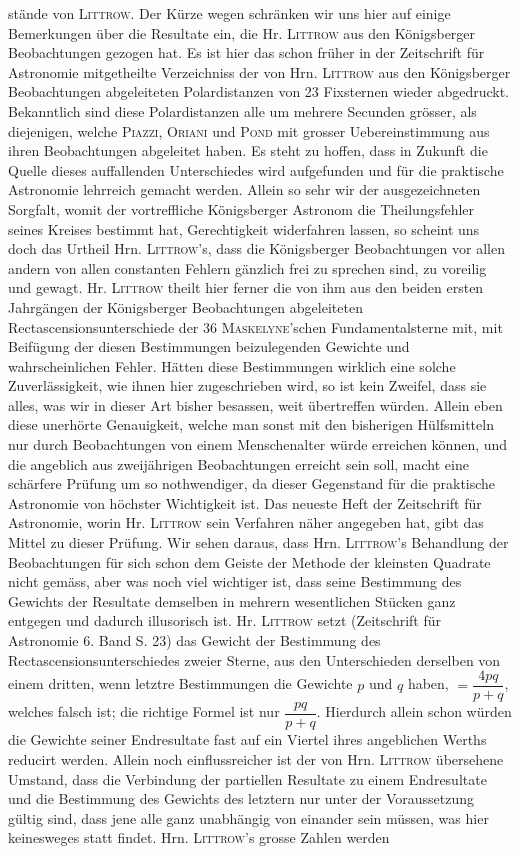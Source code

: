 \noindent stände von \textsc{Littrow}. Der Kürze wegen schränken wir uns hier auf einige Bemerkungen über die Resultate ein, die Hr. \textsc{Littrow} aus den Königsberger Beobachtungen gezogen hat. Es ist hier das schon früher in der Zeitschrift für Astronomie mitgetheilte Verzeichniss der von Hrn. \textsc{Littrow} aus den Königsberger Beobachtungen abgeleiteten Polardistanzen von 23 Fixsternen wieder abgedruckt. Bekanntlich sind diese Polardistanzen alle um mehrere Secunden grösser, als diejenigen, welche \textsc{Piazzi}, \textsc{Oriani} und \textsc{Pond} mit grosser Uebereinstimmung aus ihren Beobachtungen abgeleitet haben. Es steht zu hoffen, dass in Zukunft die Quelle dieses auffallenden Unterschiedes wird aufgefunden und für die praktische Astronomie lehrreich gemacht werden. Allein so sehr wir der ausgezeichneten Sorgfalt, womit der vortreffliche Königsberger Astronom die Theilungsfehler seines Kreises bestimmt hat, Gerechtigkeit widerfahren lassen, so scheint uns doch das Urtheil Hrn. \textsc{Littrow}'s, dass die Königsberger Beobachtungen vor allen andern von allen constanten Fehlern gänzlich frei zu sprechen sind, zu voreilig und gewagt. Hr. \textsc{Littrow} theilt hier ferner die von ihm aus den beiden ersten Jahrgängen der Königsberger Beobachtungen abgeleiteten Rectascensionsunterschiede der 36 \textsc{Maskelyne}'schen Fundamentalsterne mit, mit Beifügung der diesen Bestimmungen beizulegenden Gewichte und wahrscheinlichen Fehler. Hätten diese Bestimmungen wirklich eine solche Zuverlässigkeit, wie ihnen hier zugeschrieben wird, so ist kein Zweifel, dass sie alles, was wir in dieser Art bisher besassen, weit übertreffen würden. Allein eben diese unerhörte Genauigkeit, welche man sonst mit den bisherigen Hülfsmitteln nur durch Beobachtungen von einem Menschenalter würde erreichen können, und die angeblich aus zweijährigen Beobachtungen erreicht sein soll, macht eine schärfere Prüfung um so nothwendiger, da dieser Gegenstand für die praktische Astronomie von höchster Wichtigkeit ist. Das neueste Heft der Zeitschrift für Astronomie, worin Hr. \textsc{Littrow} sein Verfahren näher angegeben hat, gibt das Mittel zu dieser Prüfung. Wir sehen daraus, dass Hrn. \textsc{Littrow}'s Behandlung der Beobachtungen für sich schon dem Geiste der Methode der kleinsten Quadrate nicht gemäss, aber was noch viel wichtiger ist, dass seine Bestimmung des Gewichts der Resultate demselben in mehrern wesentlichen Stücken ganz entgegen und dadurch illusorisch ist. Hr. \textsc{Littrow} setzt (Zeitschrift für Astronomie 6. Band S. 23) das Gewicht der Bestimmung des Rectascensionsunterschiedes zweier Sterne, aus den Unterschieden derselben von einem dritten, wenn letztre Bestimmungen die Gewichte $p$ und $q$ haben, $=\dfrac{4pq}{p+q}$, welches falsch ist; die richtige Formel ist nur $\dfrac{pq}{p+q}$. Hierdurch allein schon würden die Gewichte seiner Endresultate fast auf ein Viertel ihres angeblichen Werths reducirt werden. Allein noch einflussreicher ist der von Hrn. \textsc{Littrow} übersehene Umstand, dass die Verbindung der partiellen Resultate zu einem Endresultate und die Bestimmung des Gewichts des letztern nur unter der Voraussetzung gültig sind, dass jene alle ganz unabhängig von einander sein müssen, was hier keinesweges statt findet. Hrn. \textsc{Littrow}'s grosse Zahlen werden 